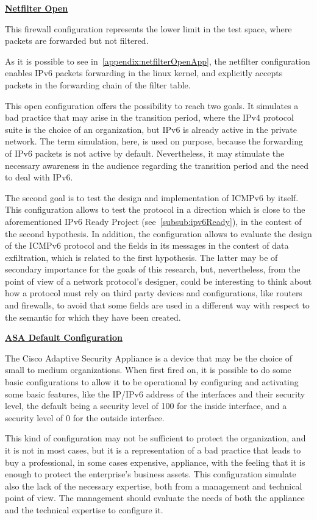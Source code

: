\documentclass[12pt]{article}
\begin{document}
\textbf{\underline{Netfilter Open}}
\label{subsub:netfilterOpen}

This firewall configuration represents the lower limit in the test space, where packets are forwarded but not filtered.

As it is possible to see in~\cref{appendix:netfilterOpenApp}, the netfilter configuration enables IPv6 packets forwarding in the linux kernel, and explicitly accepts packets in the forwarding chain of the filter table.

This open configuration offers the possibility to reach two goals. It simulates a bad practice that may arise in the transition period, where the IPv4 protocol suite is the choice of an organization, but IPv6 is already active in the private network. The term simulation, here, is used on purpose, because the forwarding of IPv6 packets is not active by default. Nevertheless, it may stimulate the necessary awareness in the audience regarding the transition period and the need to deal with IPv6.

The second goal is to test the design and implementation of ICMPv6 by itself. This configuration allows to test the protocol in a direction which is close to the aforementioned IPv6 Ready Project (see~\cref{subsub:ipv6Ready}), in the contest of the second hypothesis. In addition, the configuration allows to evaluate the design of the ICMPv6 protocol and the fields in its messages in the contest of data exfiltration, which is related to the first hypothesis. The latter may be of secondary importance for the goals of this research, but, nevertheless, from the point of view of a network protocol's designer, could be interesting to think about how a protocol must rely on third party devices and configurations, like routers and firewalls, to avoid that some fields are used in a different way with respect to the semantic for which they have been created.

\textbf{\underline{ASA Default Configuration}}
\label{subsub:asaDefault}

The Cisco Adaptive Security Appliance is a device that may be the choice of small to medium organizations. When first fired on, it is possible to do some basic configurations to allow it to be operational by configuring and activating some basic features, like the IP/IPv6 address of the interfaces and their security level, the default being a security level of 100 for the inside interface, and a security level of 0 for the outside interface.

This kind of configuration may not be sufficient to protect the organization, and it is not in most cases, but it is a representation of a bad practice that leads to buy a professional, in some cases expensive, appliance, with the feeling that it is enough to protect the enterprise's business assets. This configuration simulate also the lack of the necessary expertise, both from a management and technical point of view. The management should evaluate the needs of both the appliance and the technical expertise to configure it.
\end{document}

